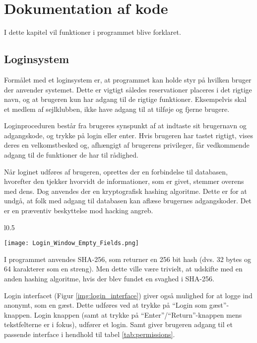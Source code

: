 \chapter{Dokumentation af kode} \label{chap:kode_docs}
I dette kapitel vil funktioner i programmet blive forklaret.

\section{Loginsystem} \label{sec:login}
Formålet med et loginsystem er, at programmet kan holde styr på hvilken bruger der anvender systemet. 
Dette er vigtigt således reservationer placeres i det rigtige navn, og at brugeren kun har adgang til de rigtige funktioner. 
Eksempelvis skal et medlem af sejlklubben, ikke have adgang til at tilføje og fjerne brugere. 

Loginproceduren består fra brugeres synspunkt af at indtaste sit brugernavn og adgangskode, og trykke på login eller enter. 
Hvis brugeren har tastet rigtigt, vises deres en velkomstbesked og, afhængigt af brugerens privileger, får vedkommende adgang til de funktioner de har til rådighed.

Når loginet udføres af brugeren, oprettes der en forbindelse til databasen, hvorefter den tjekker hvorvidt de informationer, som er givet, stemmer overens med dens. 
Dog anvendes der en kryptografisk hashing algoritme. Dette er for at undgå, at folk med adgang til databasen kan aflæse brugernes adgangskoder.
Det er en præventiv beskyttelse mod hacking angreb.

\begin{wrapfigure}{l}{0.5\textwidth}
    \label{img:login_interface}
    \vspace{-20pt}
    \begin{center}
        \texttt{[image: Login\_Window\_Empty\_Fields.png]}
    \end{center}
    \vspace{-15pt}
    \caption{Login interface}
    \vspace{10pt}
\end{wrapfigure}
I programmet anvendes SHA-256, som returner en 256 bit hash (dvs. 32 bytes og 64 karakterer som en streng). 
Men dette ville være trivielt, at udskifte med en anden hashing algoritme, hvis der blev fundet en svaghed i SHA-256. 

Login interfacet (Figur \ref{img:login_interface}) giver også mulighed for at logge ind anonymt, som en gæst. 
Dette udføres ved at trykke på ``Login som gæst''-knappen. 
Login knappen (samt at trykke på ``Enter''/``Return''-knappen mens tekstfelterne er i fokus), udfører et login.
Samt giver brugeren adgang til et passende interface i hendhold til tabel \ref{tab:permissions}.


